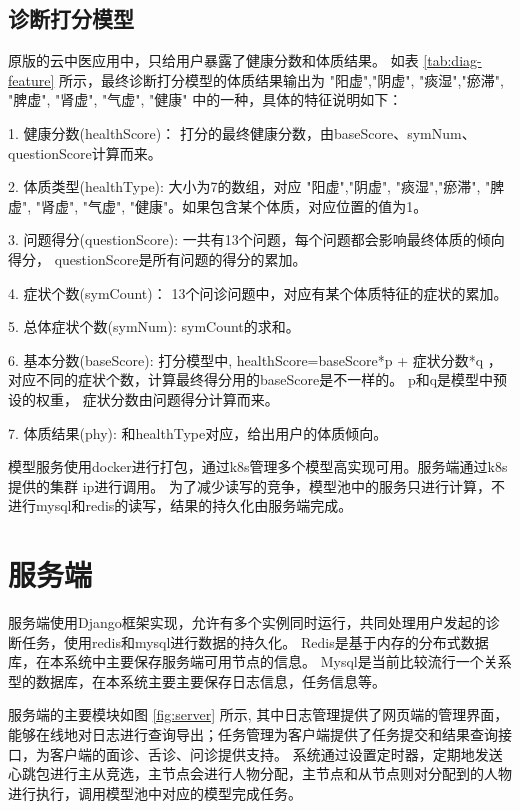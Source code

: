 \subsection{诊断打分模型}
原版的云中医应用中，只给用户暴露了健康分数和体质结果。
如表 \ref{tab:diag-feature} 所示，最终诊断打分模型的体质结果输出为 "阳虚","阴虚", "痰湿","瘀滞", "脾虚", "肾虚", "气虚", "健康" 中的一种，具体的特征说明如下：

1. 健康分数(healthScore)： 打分的最终健康分数，由baseScore、symNum、questionScore计算而来。

2. 体质类型(healthType): 大小为7的数组，对应 "阳虚","阴虚", "痰湿","瘀滞", "脾虚", "肾虚", "气虚", "健康"。如果包含某个体质，对应位置的值为1。

3. 问题得分(questionScore): 一共有13个问题，每个问题都会影响最终体质的倾向得分， questionScore是所有问题的得分的累加。

4. 症状个数(symCount)： 13个问诊问题中，对应有某个体质特征的症状的累加。

5. 总体症状个数(symNum): symCount的求和。

6. 基本分数(baseScore): 打分模型中, healthScore=baseScore*p + 症状分数*q ，对应不同的症状个数，计算最终得分用的baseScore是不一样的。 
p和q是模型中预设的权重， 症状分数由问题得分计算而来。

7. 体质结果(phy): 和healthType对应，给出用户的体质倾向。



模型服务使用docker进行打包，通过k8s管理多个模型高实现可用。服务端通过k8s提供的集群 ip进行调用。
为了减少读写的竞争，模型池中的服务只进行计算，不进行mysql和redis的读写，结果的持久化由服务端完成。

\section{服务端}

服务端使用Django框架实现，允许有多个实例同时运行，共同处理用户发起的诊断任务，使用redis和mysql进行数据的持久化。
Redis是基于内存的分布式数据库，在本系统中主要保存服务端可用节点的信息。
Mysql是当前比较流行一个关系型的数据库，在本系统主要主要保存日志信息，任务信息等。

服务端的主要模块如图 \ref{fig:server} 所示, 其中日志管理提供了网页端的管理界面，能够在线地对日志进行查询导出；任务管理为客户端提供了任务提交和结果查询接口，为客户端的面诊、舌诊、问诊提供支持。
系统通过设置定时器，定期地发送心跳包进行主从竞选，主节点会进行人物分配，主节点和从节点则对分配到的人物进行执行，调用模型池中对应的模型完成任务。


